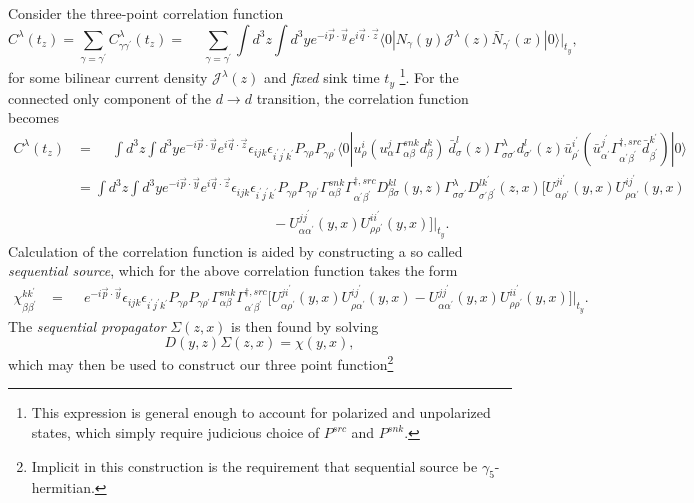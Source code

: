 \documentclass[prd,12pt,superscriptaddress,tightenlines,nofootinbib]{revtex4}
\def\a{{\alpha}}
\def\b{{\beta}}
\def\g{{\gamma}}
\def\G{{\Gamma}}
\def\l{{\lambda}}
\def\s{{\sigma}}
\def\ip{{i^\prime}}
\def\jp{{j^\prime}}
\def\kp{{k^\prime}}
\def\ap{{\alpha^\prime}}
\def\bp{{\beta^\prime}}
\def\gp{{\gamma^\prime}}
\def\rp{{\rho^\prime}}
\def\sp{{\sigma^\prime}}
\begin{document}
Consider the three-point correlation function
\begin{equation}
C^\l (t_z) = \sum_{\g = \gp}C^\l_{\g\gp} (t_z) = \phantom{-} \sum_{\g = \gp} \int d^3 z \int d^3 y  e^{- i \vec{p} \cdot \vec{y}} e^{i \vec{q} \cdot \vec{z}} \langle 0| N_{\g} (y) \mathcal{J}^{\l}(z) \bar{N}_{\gp}(x) |0\rangle \Big|_{t_y},
\end{equation}
for some bilinear current density $\mathcal{J}^{\l}(z)$ and \emph{fixed} sink time $t_y$ \footnote{This expression is general enough to account for polarized and unpolarized states, which simply require judicious choice of $P^{src}$ and $P^{snk}$. }. For the connected only component of the $d \rightarrow d$ transition, the correlation function becomes
\begin{align}
C^\l (t_z) &= \phantom{-} \int d^3 z \int d^3 y  e^{- i \vec{p} \cdot \vec{y}} e^{i \vec{q} \cdot \vec{z}} \epsilon_{ijk} \epsilon_{\ip\jp\kp} P_{\g\rho} P_{\g\rp}
	\langle 0|
		u^i_\rho (u^j_\a \G^{snk}_{\a\b} d^k_\b ) \
		\bar{d}^l_\s(z) \G^\l_{\s\sp} d^l_{\sp}(z)
		\bar{u}^\ip_\rp (\bar{u}^{\jp}_{\ap} \G^{\dagger,src}_{\ap\bp} \bar{d}^\kp_\bp )
	|0\rangle
\nonumber\\&=
\int d^3 z \int d^3 y  e^{- i \vec{p} \cdot \vec{y}} e^{i \vec{q} \cdot \vec{z}} \epsilon_{ijk} \epsilon_{\ip\jp\kp} P_{\g\rho} P_{\g\rp}  \G^{snk}_{\a\b}  \G^{\dagger,src}_{\ap\bp}
     D^{kl}_{\b\s}(y,z)\G^\l_{\s\sp} D^{l \kp}_{\sp\bp}(z,x)
     \Big[
     U^{j\ip}_{\a\rp}(y,x)U^{i\jp}_{\rho\ap}(y,x)
\nonumber\\&\qquad\qquad\qquad\qquad\qquad\qquad\qquad
     - U^{j\jp}_{\a\ap}(y,x)U^{i\ip}_{\rho\rp}(y,x)
     \Big]\Big|_{t_y}.
\end{align}
Calculation of the correlation function is aided by constructing a so called \emph{sequential source}, which for the above correlation function takes the form
\begin{align}
\chi^{ k\kp}_{\b\bp} &= \phantom{-}  e^{- i \vec{p} \cdot \vec{y}}  \epsilon_{ijk} \epsilon_{\ip\jp\kp} P_{\g\rho} P_{\g\rp} \G^{snk}_{\a\b} \G^{\dagger,src}_{\ap\bp}
  \Big[
     U^{j\ip}_{\a\rp}(y,x)U^{i\jp}_{\rho\ap}(y,x)
     - U^{j\jp}_{\a\ap}(y,x)U^{i\ip}_{\rho\rp}(y,x)
     \Big]\Big|_{t_y}.
\end{align}
The \emph{sequential propagator} $\Sigma(z,x)$ is then found by solving
\begin{equation}
D (y,z) \Sigma (z,x) = \chi (y,x),
\end{equation}
which may then be used to construct our three point function\footnote{Implicit in this construction is the requirement that sequential source be $\gamma_5$-hermitian. }
\end{document}
